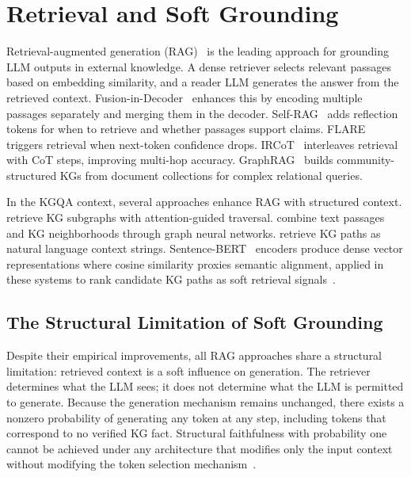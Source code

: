 \section{Retrieval and Soft Grounding}
\label{sec:rag}

Retrieval-augmented generation (RAG)~\citep{lewis2020rag} is the leading approach for grounding LLM outputs in external knowledge. A dense retriever selects relevant passages based on embedding similarity, and a reader LLM generates the answer from the retrieved context. Fusion-in-Decoder~\citep{izacard2021leveraging} enhances this by encoding multiple passages separately and merging them in the decoder. Self-RAG~\citep{asai2024selfrag} adds reflection tokens for when to retrieve and whether passages support claims. FLARE~\citep{jiang2023flare} triggers retrieval when next-token confidence drops. IRCoT~\citep{trivedi2022ircot} interleaves retrieval with CoT steps, improving multi-hop accuracy. GraphRAG~\citep{edge2024graphrag} builds community-structured KGs from document collections for complex relational queries.

In the KGQA context, several approaches enhance RAG with structured context. \citet{he2021improving} retrieve KG subgraphs with attention-guided traversal. \citet{yasunaga2021qagnn} combine text passages and KG neighborhoods through graph neural networks. \citet{shi2021kgpath} retrieve KG paths as natural language context strings. Sentence-BERT~\citep{reimers2019sbert} encoders produce dense vector representations where cosine similarity proxies semantic alignment, applied in these systems to rank candidate KG paths as soft retrieval signals~\citep{shi2021kgpath, saxena2022kgqa}.

\subsection{The Structural Limitation of Soft Grounding}

Despite their empirical improvements, all RAG approaches share a structural limitation: retrieved context is a soft influence on generation. The retriever determines what the LLM sees; it does not determine what the LLM is permitted to generate. Because the generation mechanism remains unchanged, there exists a nonzero probability of generating any token at any step, including tokens that correspond to no verified KG fact. Structural faithfulness with probability one cannot be achieved under any architecture that modifies only the input context without modifying the token selection mechanism~\citep{luo2025-graph-constrained-reasoning, geng2023grammarconstrained}.

